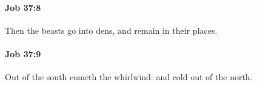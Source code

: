 		\paragraph{Job 37:8} %
			\label{JOB-37-8}

			Then the beasts go into dens, and remain in their places.


		\paragraph{Job 37:9} %
			\label{JOB-37-9}

			Out of the south cometh the whirlwind: and cold out of the north.


